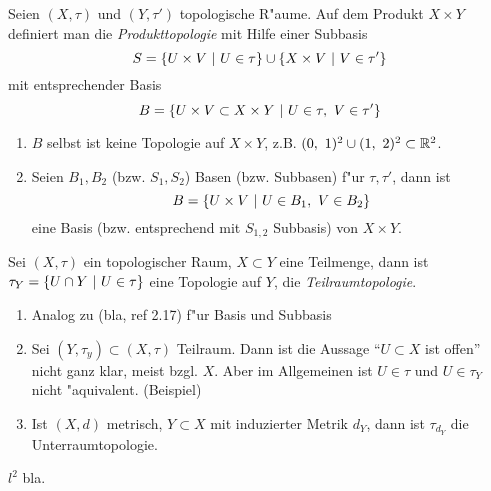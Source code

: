\begin{dfn}
    Seien $(X,\tau)$ und $(Y, \tau')$ topologische R"aume. Auf dem Produkt
    $X\times Y$ definiert man die \emph{Produkttopologie} mit Hilfe einer
    Subbasis
    \[S = \mdef[U\times V]{U\in\tau} \cup \mdef[X\times V]{V\in\tau'}\]
    mit entsprechender Basis
    \[B = \mdef[U\times V \subset X\times Y]{U\in\tau,\ V\in\tau'}\]

    \begin{bem}
        \begin{enumerate}
            \item $B$ selbst ist keine Topologie auf $X\times Y$, z.B. $(0,\ 1)^2
                \cup (1,\ 2)^2 \subset \mathbb{R}^2$.
            \item Seien $B_1, B_2$ (bzw. $S_1, S_2$) Basen (bzw. Subbasen) f"ur
                $\tau,\tau'$, dann ist
                \[B = \mdef[U\times V]{U\in B_1,\ V\in B_2}\]
                eine Basis (bzw. entsprechend mit $S_{1,2}$ Subbasis) von $X\times Y$.
        \end{enumerate}
    \end{bem}
\end{dfn}

\begin{dfn}
    Sei $(X,\tau)$ ein topologischer Raum, $X\subset Y$ eine Teilmenge, dann ist
    $\tau_Y = \mdef[U\cap Y]{U\in\tau}$ eine Topologie auf $Y$, die
    \emph{Teilraumtopologie}.

    \begin{bem}
        \begin{enumerate}
            \item Analog zu (bla, ref 2.17) f"ur Basis und Subbasis
            \item Sei $(Y,\tau_y) \subset (X,\tau)$ Teilraum. Dann ist die Aussage
                "`$U\subset X$ ist offen"' nicht ganz klar, meist bzgl. $X$. Aber
                im Allgemeinen ist $U\in\tau$ und $U\in\tau_Y$ nicht "aquivalent.
                (Beispiel)
            \item Ist $(X,d)$ metrisch, $Y\subset X$ mit induzierter Metrik $d_Y$,
                dann ist $\tau_{d_Y}$ die Unterraumtopologie.
        \end{enumerate}
    \end{bem}
\end{dfn}

\begin{bsp}
    $l^2$ bla.
\end{bsp}

